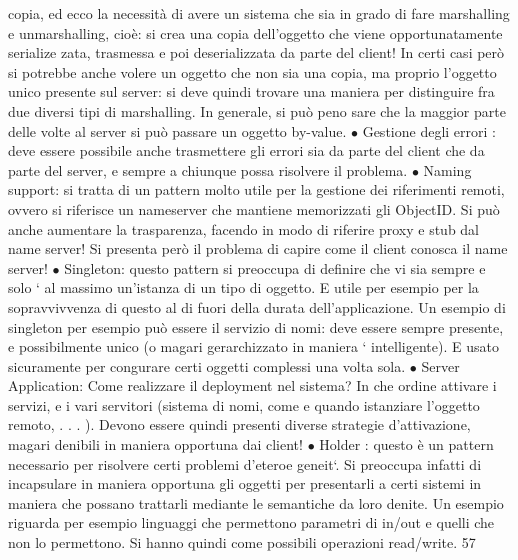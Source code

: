 copia, ed ecco la necessità
di avere un sistema che sia in grado di fare marshalling e unmarshalling,
cioè: si crea una copia dell'oggetto che viene opportunatamente serialize
zata, trasmessa e poi deserializzata da parte del client! In certi casi però
si potrebbe anche volere un oggetto che non sia una copia, ma proprio
l'oggetto unico presente sul server: si deve quindi trovare una maniera per
distinguire fra due diversi tipi di marshalling. In generale, si può peno
sare che la maggior parte delle volte al server si può passare un oggetto
by-value.
$\bullet$ Gestione degli errori : deve essere possibile anche trasmettere gli errori
sia da parte del client che da parte del server, e sempre a chiunque possa
risolvere il problema.
$\bullet$ Naming support: si tratta di un pattern molto utile per la gestione dei
riferimenti remoti, ovvero si riferisce un nameserver che mantiene memorizzati gli ObjectID. Si può anche aumentare la
trasparenza, facendo in
modo di riferire proxy e stub dal name server! Si presenta però il problema
di capire come il client conosca il name server!
$\bullet$ Singleton: questo pattern si preoccupa di definire che vi sia sempre e solo
`
al massimo un'istanza di un tipo di oggetto. E utile per esempio per
la sopravvivvenza di questo al di fuori della durata dell'applicazione. Un
esempio di singleton per esempio può essere il servizio di nomi: deve essere
sempre presente, e possibilmente unico (o magari gerarchizzato in maniera
`
intelligente). E usato sicuramente per congurare certi oggetti complessi
una volta sola.
$\bullet$ Server Application: Come realizzare il deployment nel sistema? In che
ordine attivare i servizi, e i vari servitori (sistema di nomi, come e quando
istanziare l'oggetto remoto, . . . ). Devono essere quindi presenti diverse
strategie d'attivazione, magari denibili in maniera opportuna dai client!
$\bullet$ Holder : questo è un pattern necessario per risolvere certi problemi d'eteroe
geneit`. Si preoccupa infatti di incapsulare in maniera opportuna gli
oggetti per presentarli a certi sistemi in maniera che possano trattarli
mediante le semantiche da loro denite. Un esempio riguarda per esempio linguaggi che permettono parametri di in/out e
quelli che non lo
permettono. Si hanno quindi come possibili operazioni read/write.
57

